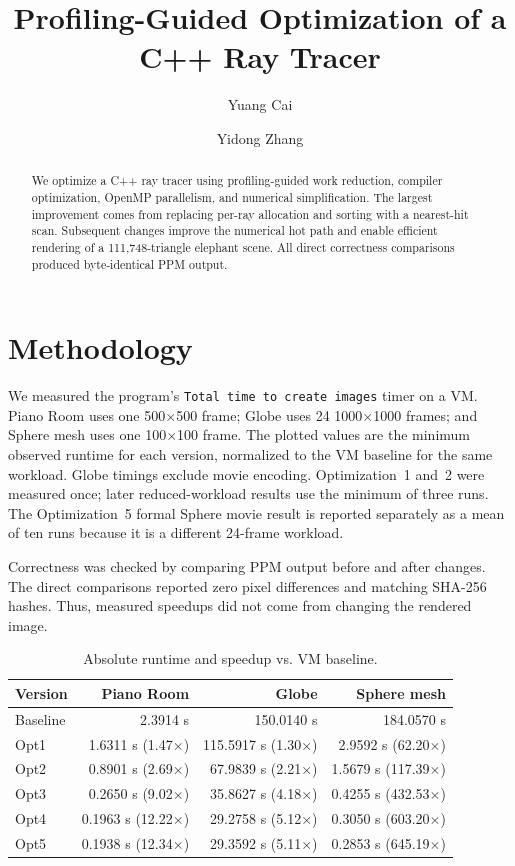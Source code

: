 \documentclass[sigplan,screen]{acmart}
\title{Profiling-Guided Optimization of a C++ Ray Tracer}
\author{Yuang Cai}
\author{Yidong Zhang}
\begin{document}
\begin{abstract}
We optimize a C++ ray tracer using profiling-guided work reduction,
compiler optimization, OpenMP parallelism, and numerical simplification.
The largest improvement comes from replacing per-ray allocation and
sorting with a nearest-hit scan. Subsequent changes improve the numerical
hot path and enable efficient rendering of a 111,748-triangle elephant
scene. All direct correctness comparisons produced byte-identical PPM
output.
\end{abstract}

\maketitle

\section{Methodology}

We measured the program's \texttt{Total time to create images} timer on a
VM. Piano Room uses one 500$\times$500 frame; Globe uses 24 1000$\times$1000
frames; and Sphere mesh uses one 100$\times$100 frame. The plotted values
are the minimum observed runtime for each version, normalized to the VM
baseline for the same workload. Globe timings exclude movie encoding.
Optimization~1 and~2 were measured once; later reduced-workload results use
the minimum of three runs. The Optimization~5 formal Sphere movie result is
reported separately as a mean of ten runs because it is a different
24-frame workload.

Correctness was checked by comparing PPM output before and after changes.
The direct comparisons reported zero pixel differences and matching SHA-256
hashes. Thus, measured speedups did not come from changing the rendered
image.

\begin{table}[t]
\caption{Absolute runtime and speedup vs. VM baseline.}
\label{tab:runtimes}
\small
\begin{tabular}{@{}lrrr@{}}
\toprule
Version & Piano Room & Globe & Sphere mesh \\
\midrule
Baseline    & 2.3914 s & 150.0140 s & 184.0570 s \\
Opt1        & 1.6311 s (1.47$\times$) & 115.5917 s (1.30$\times$) & 2.9592 s (62.20$\times$) \\
Opt2        & 0.8901 s (2.69$\times$) & 67.9839 s (2.21$\times$) & 1.5679 s (117.39$\times$) \\
Opt3        & 0.2650 s (9.02$\times$) & 35.8627 s (4.18$\times$) & 0.4255 s (432.53$\times$) \\
Opt4        & 0.1963 s (12.22$\times$) & 29.2758 s (5.12$\times$) & 0.3050 s (603.20$\times$) \\
Opt5        & 0.1938 s (12.34$\times$) & 29.3592 s (5.11$\times$) & 0.2853 s (645.19$\times$) \\
\bottomrule
\end{tabular}
\end{table}
\end{document}

